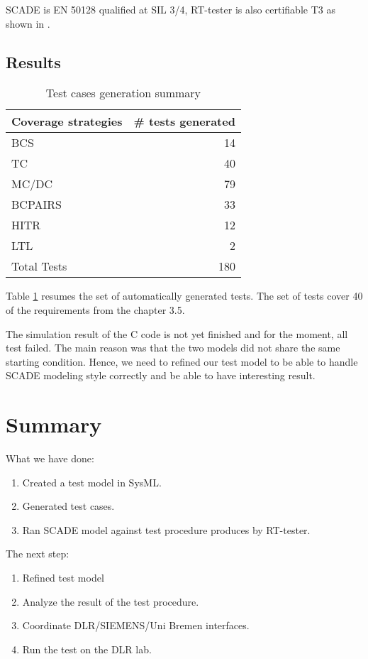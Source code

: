 SCADE is EN 50128 qualified at SIL 3/4, RT-tester is also certifiable
T3 as shown in \cite{peleska_efficient_2012}.

\subsection{Results}

\begin{table}[htbp]
\centering
\begin{tabular}{lr}\toprule
  Coverage strategies & \# tests generated  \\\midrule
  BCS & 14 \\
  TC & 40 \\
  MC/DC & 79 \\
  BCPAIRS & 33\\
  HITR & 12 \\
  LTL & 2 \\ \midrule
  Total Tests& 180\\\bottomrule
\end{tabular}

\vspace{1em}
\caption{\label{tbl:test_summary} Test cases generation summary}
\end{table}

Table \ref{tbl:test_summary} resumes the set of automatically
generated tests.
The set of tests cover 40 of the requirements from the chapter 3.5.


The simulation result of the C code is not yet finished and for the
moment, all test failed. The main reason was that the two
models did not share the same starting condition.
Hence, we  need to refined our test model to be able to handle SCADE
modeling style correctly and be able to have interesting result.



\section{Summary}

What we have done:
\begin{enumerate}
\item Created a test model in SysML.
\item Generated test cases.
\item Ran SCADE model against test procedure produces by RT-tester.
\end{enumerate}
 
 The next step:
 \begin{enumerate}
 \item Refined test model
 \item Analyze the result of the test procedure.
 \item Coordinate DLR/SIEMENS/Uni Bremen interfaces.
 \item Run the test on the DLR lab.
 \end{enumerate}

